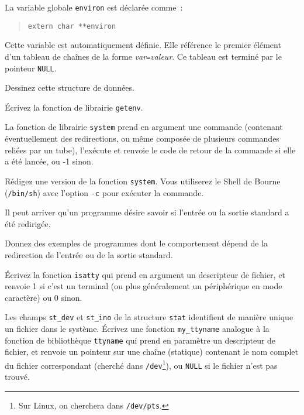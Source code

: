 %


% 


\question

La variable globale {\tt environ} est déclarée comme~:

\begin {quote}
    \verb|extern char **environ|
\end {quote}

Cette variable est automatiquement définie. Elle référence le premier
élément d'un tableau de chaînes de la forme {\em var{\tt=}valeur}. Ce
tableau est terminé par le pointeur {\tt NULL}.

Dessinez cette structure de données.

Écrivez la fonction de librairie {\tt getenv}.


\question

La fonction de librairie {\tt system} prend en argument une commande
(contenant éventuellement des redirections, ou même composée de
plusieurs commandes reliées par un tube), l'exécute et renvoie
le code de retour de la commande si elle a été lancée, ou -1
sinon.

Rédigez une version de la fonction \texttt {system}.  Vous utiliserez
le Shell de Bourne ({\tt /bin/sh}) avec l'option {\tt -c} pour exécuter
la commande.


\question

Il peut arriver qu'un programme désire savoir si l'entrée ou la
sortie standard a été redirigée.

Donnez des exemples de programmes dont le comportement dépend de la
redirection de l'entrée ou de la sortie standard.

Écrivez la fonction {\tt isatty} qui prend en argument un descripteur
de fichier, et renvoie 1 si c'est un terminal (ou plus généralement un
périphérique en mode caractère) ou 0 sinon.


\question

Les champs {\tt st\_dev} et {\tt st\_ino} de la structure {\tt stat}
identifient de manière unique un fichier dans le système. Écrivez
une fonction {\tt my\_ttyname} analogue à la fonction de bibliothèque
\texttt {ttyname} qui prend en paramètre un descripteur de fichier, et
renvoie un pointeur sur une chaîne (statique) contenant le nom complet
du fichier correspondant (cherché dans {\tt /dev}\footnote {Sur Linux,
on cherchera dans \texttt {/dev/pts}.}), ou \texttt {NULL} si le fichier
n'est pas trouvé.


